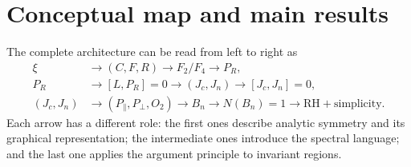 \documentclass[11pt]{amsart}
\theoremstyle{definition}
\theoremstyle{remark}
\begin{document}
\section{Conceptual map and main results}\label{sec:mainresults}
The complete architecture can be read from left to right as
\begin{equation}\label{eq:roadmap}
\boxed{\begin{aligned}
\xi &\longrightarrow (C,F,R)\longrightarrow F_2/F_4\longrightarrow P_R,\\
P_R &\longrightarrow [L,P_R]=0\longrightarrow (J_c,J_n)\longrightarrow [J_c,J_n]=0,\\
(J_c,J_n)&\longrightarrow (P_{\parallel},P_{\perp},O_2)\longrightarrow B_n
\longrightarrow N(B_n)=1\longrightarrow \mathrm{RH}+\text{simplicity}.
\end{aligned}}
\end{equation}
Each arrow has a different role: the first ones describe analytic symmetry and its graphical representation; the intermediate ones introduce the spectral language; and the last one applies the argument principle to invariant regions.
\end{document}
